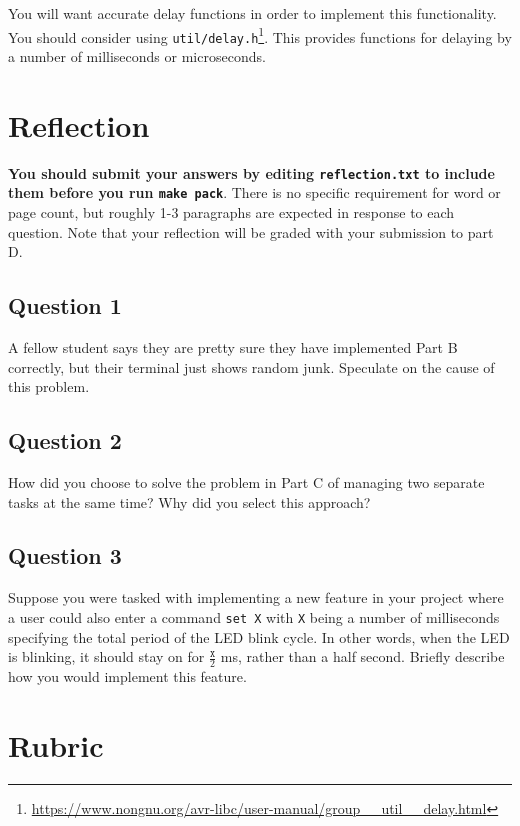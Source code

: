 \documentclass{article}
\begin{document}
You will want accurate delay functions in order to implement this
functionality. You should consider using
\texttt{util/delay.h}\footnote{\url{https://www.nongnu.org/avr-libc/user-manual/group__util__delay.html}}.
This provides functions for delaying by a number of milliseconds or
microseconds.

\section{Reflection}

\textbf{You should submit your answers by editing \texttt{reflection.txt} to
include them before you run \texttt{make pack}}.  There is no specific
requirement for word or page count, but roughly 1-3 paragraphs are expected in
response to each question. Note that your reflection will be graded with your
submission to part D.

\subsection{Question 1}

A fellow \course \hspace{1pt} student says they are pretty sure they have
implemented Part B correctly, but their terminal just shows random junk.
Speculate on the cause of this problem.

\subsection{Question 2}

How did you choose to solve the problem in Part C of managing two separate
tasks at the same time? Why did you select this approach?

\subsection{Question 3}

Suppose you were tasked with implementing a new feature in your project where a
user could also enter a command \texttt{set X} with \texttt{X} being a number
of milliseconds specifying the total period of the LED blink cycle. In other
words, when the LED is blinking, it should stay on for $\frac{\texttt{X}}{2}$ ms,
rather than a half second. Briefly describe how you would implement this
feature.

\section{Rubric}
\end{document}
